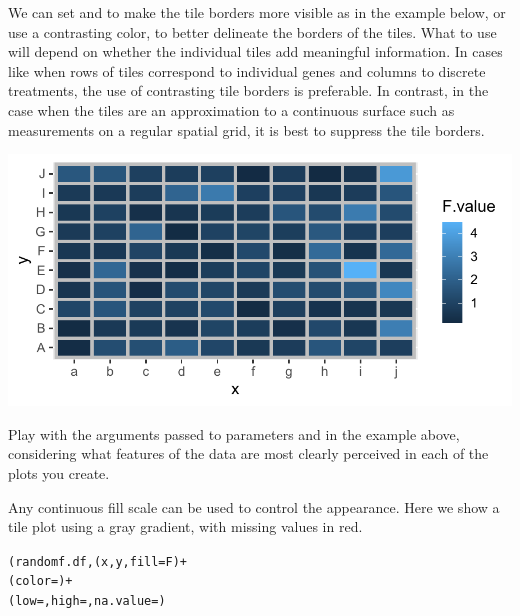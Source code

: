 \documentclass[krantz2]{krantz}\usepackage{knitr}
\begin{document}
We can set  and  to make the tile borders more visible as in the example below, or use a contrasting color, to better delineate the borders of the tiles. What to use will depend on whether the individual tiles add meaningful information. In cases like when rows of tiles correspond to individual genes and columns to discrete treatments, the use of contrasting tile borders is preferable. In contrast, in the case when the tiles are an approximation to a continuous surface such as measurements on a regular spatial grid, it is best to suppress the tile borders.

\begin{knitrout}\footnotesize
{}\color{fgcolor}\begin{kframe}
\begin{alltt}
    \hlopt{+}
  \hlstd{(} \hlstd{=} \hlstd{,}  \hlstd{=} \hlstd{)}
\end{alltt}
\end{kframe}

{\centering \includegraphics[width=.7\textwidth]{figure/pos-tile-plot-03-1} 

}



\end{knitrout}

\begin{playground}
Play with the arguments passed to parameters  and  in the example above, considering what features of the data are most clearly perceived in each of the plots you create.
\end{playground}

Any continuous fill scale can be used to control the appearance. Here we show a tile plot using a gray gradient, with missing values in red.

\begin{knitrout}\footnotesize
{}\color{fgcolor}\begin{kframe}
\begin{alltt}
(randomf.df, (x, y, fill = F) +
  (color = ) +
  (low = , high = , na.value = )
\end{alltt}
\end{kframe}
\end{knitrout}
\end{document}
